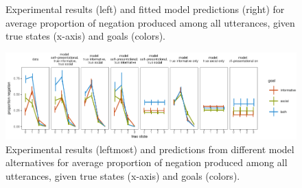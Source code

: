 \documentclass[12pt]{article}
\begin{document}
\begin{figure}
\centering
\caption{\label{fig:negationPrediction}Experimental results (left) and fitted model predictions (right) for average proportion of negation produced among all utterances, given true states (x-axis) and goals (colors).}
\end{figure}




\begin{figure}
\centering
\includegraphics{fig/negationPredictionComp-1.pdf}
\caption{\label{fig:negationPredictionComp}Experimental results (leftmost)
and predictions from different model alternatives for average proportion
of negation produced among all utterances, given true states (x-axis)
and goals (colors).}
\end{figure}
\end{document}
